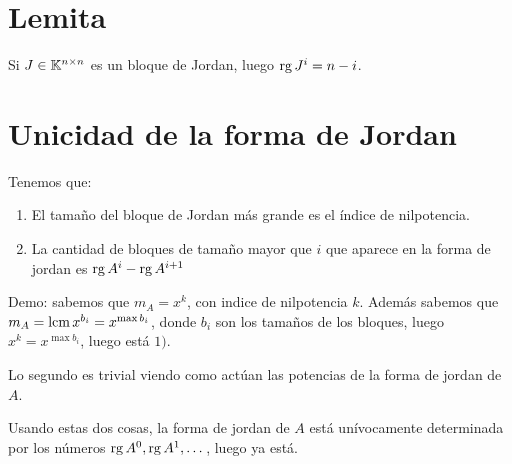 \documentclass{article}
\begin{document}
\section*{Lemita}
Si $J \in \mathbb{K}^{n \times n}$ es un bloque de Jordan, luego $\operatorname{rg} J^i = n-i$.

\section*{Unicidad de la forma de Jordan}
Tenemos que:
\begin{enumerate}
	\item El tamaño del bloque de Jordan más grande es el índice de nilpotencia.
	\item La cantidad de bloques de tamaño mayor que $i$ que aparece en la forma de jordan es $\operatorname{rg} A^i - \operatorname{rg} A^{i+1}$
\end{enumerate}

Demo: sabemos que $m_A = x^k$, con indice de nilpotencia $k$. Además sabemos que $m_A = \operatorname{lcm} x^{b_i} = x^{\max b_i}$, donde $b_i$ son los tamaños de los bloques, luego $x^k = x^{\max b_i}$, luego está $1)$.

Lo segundo es trivial viendo como actúan las potencias de la forma de jordan de $A$.

Usando estas dos cosas, la forma de jordan de $A$ está unívocamente determinada por los números $\operatorname{rg} A^0, \operatorname{rg} A^1, \dots$, luego ya está.
\end{document}
